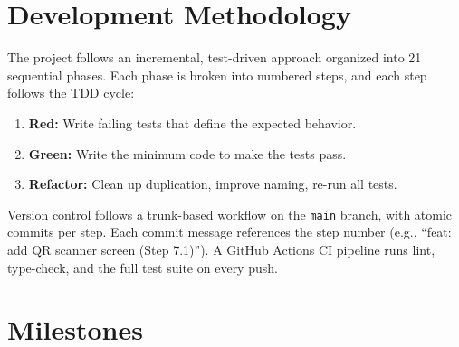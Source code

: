 \documentclass[12pt,a4paper]{report}
\renewcommand\_{\textunderscore\hspace{0pt}}
\begin{document}
\section{Development Methodology}

The project follows an incremental, test-driven approach \cite{Beck03, Somm15} organized into 21 sequential phases. Each phase is broken into numbered steps, and each step follows the TDD cycle:

\begin{enumerate}[noitemsep]
    \item \textbf{Red:} Write failing tests that define the expected behavior.
    \item \textbf{Green:} Write the minimum code to make the tests pass.
    \item \textbf{Refactor:} Clean up duplication, improve naming, re-run all tests.
\end{enumerate}

Version control follows a trunk-based workflow on the \texttt{main} branch, with atomic commits per step. Each commit message references the step number (e.g., ``feat: add QR scanner screen (Step 7.1)''). A GitHub Actions CI pipeline runs lint, type-check, and the full test suite on every push.

\section{Milestones}
\end{document}
